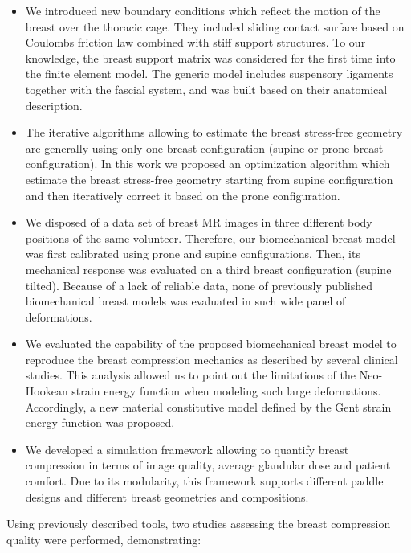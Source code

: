 \begin{itemize}
\item We introduced new boundary conditions which reflect the motion of the breast over the thoracic cage.  They included sliding contact surface based on Coulombs friction law combined with stiff support structures. To our knowledge,  the breast support matrix was considered for the first time into the finite element model. The generic model includes suspensory ligaments together with the fascial system, and was built based on their anatomical description.   

\item The iterative algorithms allowing to estimate the breast stress-free  geometry are generally using only one breast configuration (supine or prone breast configuration). In this work we proposed an optimization algorithm which estimate the breast stress-free geometry starting from supine configuration and then iteratively correct it based on the prone configuration. 

\item  We disposed of a data set of breast MR images in three different body positions of the same volunteer. Therefore, our biomechanical breast model was first calibrated using prone and supine configurations. Then, its mechanical response was evaluated on a third breast configuration (supine tilted). Because of a lack of reliable data, none of previously published biomechanical breast models was evaluated in such wide panel of deformations.  

\item We evaluated the capability of the proposed biomechanical breast model to reproduce the breast compression mechanics as described by several clinical studies.  This analysis allowed us to point out the limitations of the Neo-Hookean strain energy function when modeling such large deformations.  Accordingly, a new material constitutive model defined by the Gent strain energy function was proposed.


\item We developed a simulation framework allowing to quantify breast compression in terms of image quality, average glandular dose and patient comfort. Due to its modularity, this framework supports different paddle designs and different breast geometries and compositions. 
\end{itemize}

\noindent
Using previously described tools, two studies assessing the breast compression quality were performed, demonstrating:

